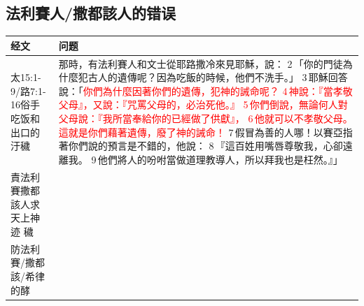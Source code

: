 \subsection{法利賽人/撒都該人的错误}
\begin{table}[H]
  \centering  
    \begin{tabular}{p{4.72em}|p{40.72em}} \toprule
 经文& \textbf{问题}  \\ \midrule
 太15:1-9/路7:1-16俗手吃饭和出口的汙穢&那時，有法利賽人和文士從耶路撒冷來見耶穌，說： 2 「你的門徒為什麼犯古人的遺傳呢？因為吃飯的時候，他們不洗手。」 3 耶穌回答說：「\textcolor{red}{你們為什麼因著你們的遺傳，犯神的誡命呢？ 4 神說：『當孝敬父母』，又說：『咒罵父母的，必治死他。』 5 你們倒說，無論何人對父母說：『我所當奉給你的已經做了供獻』， 6 他就可以不孝敬父母。這就是你們藉著遺傳，廢了神的誡命！} 7 假冒為善的人哪！以賽亞指著你們說的預言是不錯的，他說： 8 『這百姓用嘴唇尊敬我，心卻遠離我。 9 他們將人的吩咐當做道理教導人，所以拜我也是枉然。』」\\\midrule
責法利賽撒都該人求天上神迹 穢&\\ \midrule
防法利賽/撒都該/希律的酵 &\\ \midrule
    \bottomrule
    \end{tabular}%
  \label{tab:addlabel}%
\end{table}%


